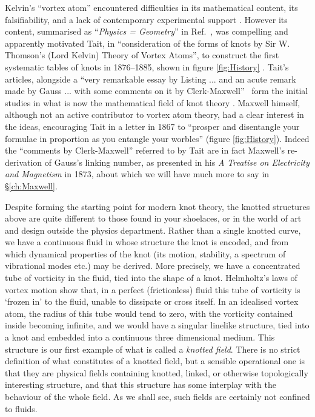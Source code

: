 Kelvin's ``vortex atom'' encountered difficulties in its mathematical content, its falsifiability, and a lack of contemporary experimental support \citep{KelvinMasters}. However its content, summarised as ``\textit{Physics = Geometry}'' in Ref.~\citep{KelvinAMS}, was compelling and apparently motivated Tait, in ``consideration of the forms of knots by Sir W. Thomson's (Lord Kelvin) Theory of Vortex Atoms'', to construct the first systematic tables of knots in 1876--1885, shown in figure \ref{fig:History} \citep{Tait1, Tait2, Tait3}. Tait's articles, alongside a ``very remarkable essay by Listing ... and an acute remark made by Gauss ... with some comments on it by Clerk-Maxwell''~\citep{Tait1} form the initial studies in what is now the mathematical field of knot theory \citep{Lickorish1997}. Maxwell himself, although not an active contributor to vortex atom theory, had a clear interest in the ideas, encouraging Tait in a letter in 1867 to ``prosper and disentangle your formulae in proportion as you entangle your worbles'' (figure \ref{fig:History}). Indeed the ``comments by Clerk-Maxwell'' referred to by Tait are in fact Maxwell's re-derivation of Gauss's linking number, as presented in his \textit{A Treatise on Electricity and Magnetism} \citep{Maxwell2} in 1873, about which we will have much more to say in \S\ref{ch:Maxwell}. 

Despite forming the starting point for modern knot theory, the knotted structures above are quite different to those found in your shoelaces, or in the world of art and design outside the physics department. Rather than a single knotted curve, we have a continuous fluid in whose structure the knot is encoded, and from which dynamical properties of the knot (its motion, stability, a spectrum of vibrational modes etc.) may be derived. More precisely, we have a concentrated tube of vorticity in the fluid, tied into the shape of a knot. Helmholtz's laws of vortex motion \citep{Helmholtz} show that, in a perfect (frictionless) fluid this tube of vorticity is `frozen in' to the fluid, unable to dissipate or cross itself. In an idealised vortex atom, the radius of this tube would tend to zero, with the vorticity contained inside becoming infinite, and we would have a singular linelike structure, tied into a knot and embedded into a continuous three dimensional medium. This structure is our first example of what is called a \emph{knotted field}. There is no strict definition of what constitutes of a knotted field, but a sensible operational one is that they are physical fields containing knotted, linked, or otherwise topologically interesting structure, and that this structure has some interplay with the behaviour of the whole field. As we shall see, such fields are certainly not confined to fluids.

